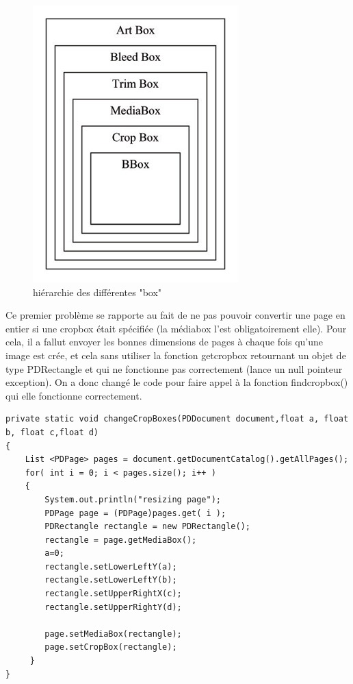      \begin{figure}[h]
            \begin{center}
            \includegraphics[scale=0.6]{crop_media_box.jpg} 
            \end{center}
            \caption{hiérarchie des différentes "box"}
            \label{hiérarchie des différentes "box" }
     \end{figure}

	        Ce premier problème se rapporte au fait de ne pas pouvoir convertir
        une page en entier si une cropbox était spécifiée (la médiabox l'est 
        obligatoirement elle). Pour cela, il a fallut envoyer les bonnes dimensions 
        de pages à chaque fois qu'une image est crée, et cela sans utiliser la fonction
        getcropbox retournant un objet de type PDRectangle et qui ne fonctionne 
        pas correctement (lance un null pointeur exception). On a donc changé le
        code pour faire appel à la fonction findcropbox() qui elle fonctionne 
        correctement.




    \lstset{language=Java}
	\begin{lstlisting} 
private static void changeCropBoxes(PDDocument document,float a, float b, float c,float d)
{
	List <PDPage> pages = document.getDocumentCatalog().getAllPages();
	for( int i = 0; i < pages.size(); i++ )
	{
        System.out.println("resizing page");
        PDPage page = (PDPage)pages.get( i );
        PDRectangle rectangle = new PDRectangle();
        rectangle = page.getMediaBox();
        a=0;
        rectangle.setLowerLeftY(a);
        rectangle.setLowerLeftY(b);
        rectangle.setUpperRightX(c);
        rectangle.setUpperRightY(d);

        page.setMediaBox(rectangle);
        page.setCropBox(rectangle);
	 }
}
 \end{lstlisting}

